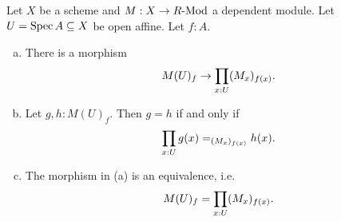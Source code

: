 \begin{lemma}%
  \label{module-bundle-localization-pointwise}
  Let $X$ be a scheme and $M:X\to R\text{-}\mathrm{Mod}$ a dependent module.
  Let $U=\operatorname{Spec} A\subseteq X$ be open affine.
  Let $f:A$.
  \begin{enumerate}[(a)]
  \item There is a morphism
    \[
      M(U)_f\to \prod_{x:U}(M_x)_{f(x)}
      \rlap{.}
    \]
  \item Let $g,h:M(U)_f$. Then $g=h$ if and only if
    \[
      \prod_{x:U}g(x)=_{(M_x)_{f(x)}}h(x)
      \rlap{.}
    \]
  \item The morphism in (a) is an equivalence, i.e.
    \[
      M(U)_f=\prod_{x:U}(M_x)_{f(x)}
      \rlap{.}
    \]
  \end{enumerate}
\end{lemma}

